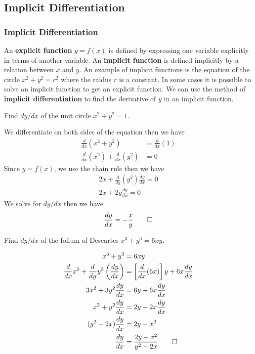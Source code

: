 \subsection{Implicit Differentiation}
\subsubsection{Implicit Differentiation}
An \textbf{explicit function} \(y=f(x)\) is defined by expressing one variable
explicitly in terms of another variable.
An \textbf{implicit function} is defined implicitly by a relation between
\(x\) and \(y\).
An example of implicit functions is the equation of the circle \(x^2+y^2=r^2\)
where the raidus \(r\) is a constant.
In some cases it is possible to solve an implicit function to get an explicit function.
We can use the method of \textbf{implicit differentiation} to find the derivative
of \(y\) in an implicit function.
\begin{problem}
    Find \(dy/dx\) of the unit circle \(x^2+y^2=1\).
\end{problem}
\begin{solution}
    We differentiate on both sides of the equation then we have
    \begin{align*}
        \frac{d}{dx}(x^2+y^2)&=\frac{d}{dx}(1)\\
        \frac{d}{dx}(x^2)+\frac{d}{dx}(y^2)&=0
    \end{align*}
    Since \(y=f(x)\), we use the chain rule then we have
    \begin{align*}
        2x+\frac{d}{dy}(y^2)\frac{dy}{dx}=0\\
        2x+2y\frac{dy}{dx}=0
    \end{align*}
    We solve for \(dy/dx\) then we have
    \[\frac{dy}{dx}=-\frac{x}{y}\qedhere\]
\end{solution}
\begin{problem}
    Find \(dy/dx\) of the folium of Descartes \(x^3+y^3=6xy\).
\end{problem}
\begin{solution}
    \begin{align*}
        x^3+y^3&=6xy\\\frac{d}{dx}x^3+\frac{d}{dy}y^3\left(\frac{dy}{dx}\right)
        &=\left[\frac{d}{dx}(6x)\right]y+6x\frac{dy}{dx}\\3x^2+3y^2\frac{dy}{dx}
        &=6y+6x\frac{dy}{dx}\\x^2+y^2\frac{dy}{dx}&=2y+2x\frac{dy}{dx}
        \\(y^2-2x)\frac{dy}{dx}&=2y-x^2\\\frac{dy}{dx}&=\frac{2y-x^2}{y^2-2x}\qedhere
    \end{align*}
\end{solution}
